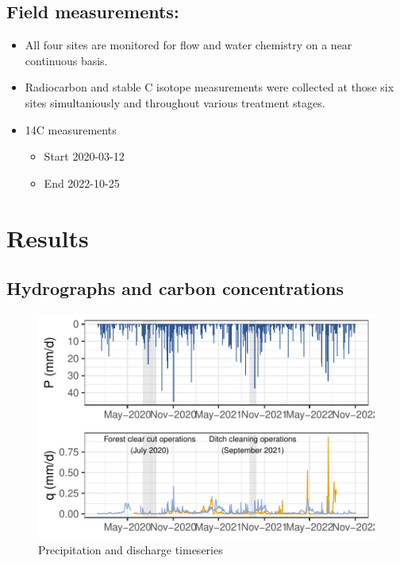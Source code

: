 \documentclass[
]{article}
\begin{document}
\subsection{Field measurements:}\label{field-measurements}

\begin{itemize}
\item
  All four sites are monitored for flow and water chemistry on a near
  continuous basis.
\item
  Radiocarbon and stable C isotope measurements were collected at those
  six sites simultaniously and throughout various treatment stages.
\item
  14C measurements

  \begin{itemize}
  \item
    Start 2020-03-12
  \item
    End 2022-10-25
  \end{itemize}
\end{itemize}

\section{Results}\label{results}

\subsection{Hydrographs and carbon
concentrations}\label{hydrographs-and-carbon-concentrations}

\begin{figure}[H]

{\centering \includegraphics{index_files/figure-pdf/unnamed-chunk-2-1.pdf}

}

\caption{Precipitation and discharge timeseries}

\end{figure}%
\end{document}
